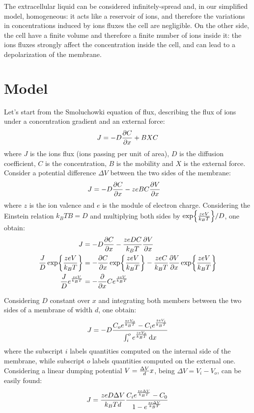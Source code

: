 \documentclass[11pt,a4 paper]{article}
\let\oldfrac\frac
\renewcommand{\frac}[3][d]{\ifthenelse{\equal{#1}{d}}{\oldfrac{#2}{#3}}{\nicefrac{#2}{#3}}}
\begin{document}
The extracellular liquid can be considered infinitely-spread and, in our simplified model, homogeneous: it acts like a reservoir of ions, and therefore the variations in concentrations induced by ions fluxes the cell are negligible. On the other side, the cell have a finite volume and therefore a finite number of ions inside it: the ions fluxes strongly affect the concentration inside the cell, and can lead to a depolarization of the membrane.

\section{Model}
Let's start from the Smoluchowki equation of flux, describing the flux of ions under a concentration gradient and an external force:
\begin{gather*}
    J = - D \pdv{C}{x} + BXC
\end{gather*}
where $J$ is the ions flux (ions passing per unit of area), $D$ is the diffusion coefficient, $C$ is the concentration, $B$ is the mobility and $X$ is the external force. Consider a potential difference $\Delta V$ between the two sides of the membrane:
\begin{align*}
    J &= - D \pdv{C}{x} - zeBC\pdv{V}{x}
\end{align*}
where $z$ is the ion valence and $e$ is the module of electron charge. Considering the Einstein relation $k_BTB = D$ and multiplying both sides by $\exp{\frac{zeV}{k_BT}} / D$, one obtain:
\begin{align*}
    J &= - D \pdv{C}{x} - \frac{zeDC}{k_BT}\pdv{V}{x} \\
    \frac{J}{D} \exp{\frac{zeV}{k_BT}} &= - \pdv{C}{x} \exp{\frac{zeV}{k_BT}} - \frac{zeC}{k_BT}\pdv{V}{x} \exp{\frac{zeV}{k_BT}} \\
    \frac{J}{D}  e^{\frac{zeV}{k_BT}} &= - \pdv{x} C e^{\frac{zeV}{k_BT}}
\end{align*}

Considering $D$ constant over $x$ and integrating both members between the two sides of a membrane of width $d$, one obtain:
\begin{align*}
    J = - D \frac{C_oe^{\frac{zeV_o}{k_BT}} - C_ie^{\frac{zeV_i}{k_BT} }}{ \int_i^o e^{\frac{zeV_o}{k_BT}} \dd{x}}
\end{align*}
where the subscript $i$ labels quantities computed on the internal side of the membrane, while subscript $o$ labels quantities computed on the external one. Considering a linear dumping potential $V = \frac{\Delta V}{d} x$, being $\Delta V = V_i - V_o$, can be easily found:
\begin{align*}
    J = \frac{zeD\Delta V}{k_BTd} \frac{C_ie^{\frac{ze\Delta V}{k_BT} } - C_0 }{1 - e^{\frac{ze\Delta V}{k_BT} }}
\end{align*}
\end{document}
